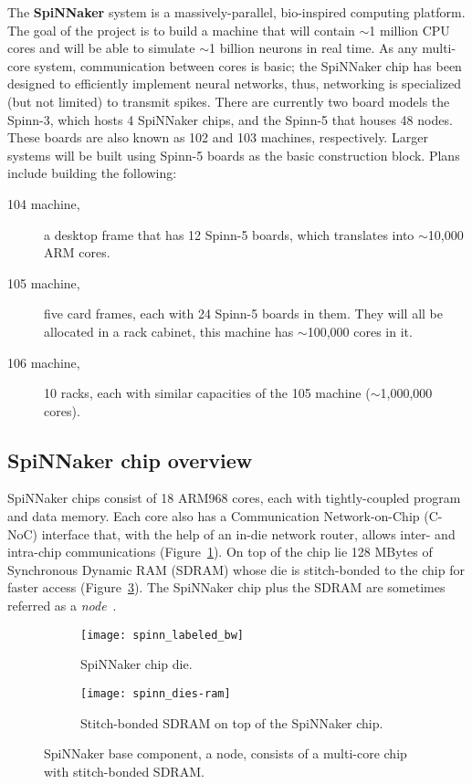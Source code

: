 The \textbf{SpiNNaker} system is a massively-parallel, bio-inspired computing platform. The goal of the project is to build a machine that will contain $\sim$1 million CPU cores and will be able to simulate $\sim$1 billion neurons in real time. As any multi-core system, communication between cores is basic; the SpiNNaker chip has been designed to efficiently implement neural networks, thus, networking is specialized (but not limited) to transmit spikes. There are currently two board models the Spinn-3, which hosts 4 SpiNNaker chips, and the Spinn-5 that houses 48 nodes. These boards are also known as 102 and 103 machines, respectively. Larger systems will be built using Spinn-5 boards as the basic construction block. Plans include building the following: 
\begin{description}
  \item[104 machine,] a desktop frame that has 12 Spinn-5 boards, which translates into $\sim$10,000 ARM cores.
  \item[105 machine,] five card frames, each with 24 Spinn-5 boards in them. They will all be allocated in a rack cabinet, this machine has $\sim$100,000 cores in it.
  \item[106 machine,] 10 racks, each with similar capacities of the 105 machine ($\sim$1,000,000 cores).
\end{description}

\subsection{SpiNNaker chip overview}

SpiNNaker chips consist of 18 ARM968 cores, each with tightly-coupled program and data memory. Each core also has a Communication Network-on-Chip (C-NoC) interface that, with the help of an in-die network router, allows inter- and intra-chip communications (Figure~\ref{fig:hw:spinnaker-die}). On top of the chip lie 128 MBytes of Synchronous Dynamic RAM (SDRAM) whose die is stitch-bonded to the chip for faster access (Figure~\ref{fig:hw:bonded-sdram}). The SpiNNaker chip plus the SDRAM are sometimes referred as a \emph{node}~\cite{furber2013overview}.

\begin{figure}[h]
  \begin{center}
    \begin{subfigure}[b]{0.55\textwidth}
      \texttt{[image: spinn\_labeled\_bw]}
      \caption{SpiNNaker chip die.}
      \label{fig:hw:spinnaker-die}
    \end{subfigure}
    \hspace*{0.3cm}
    \begin{subfigure}[b]{0.4\textwidth}
      \texttt{[image: spinn\_dies-ram]}
      \caption{Stitch-bonded SDRAM on top of the SpiNNaker chip.}
      \label{fig:hw:bonded-sdram}
    \end{subfigure}
    \caption{SpiNNaker base component, a node, consists of a multi-core chip with stitch-bonded SDRAM.}
  \end{center}
\end{figure}

